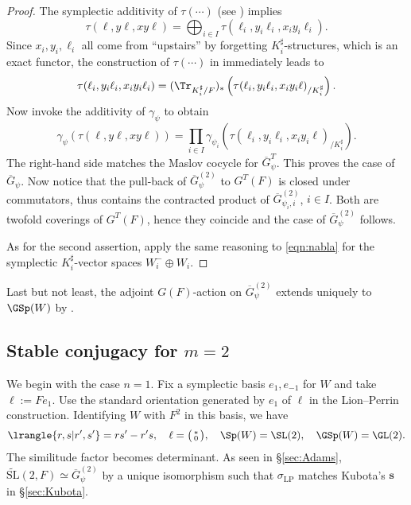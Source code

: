 \documentclass[a4paper,10pt]{article}
\begin{document}
\begin{proof}
	The symplectic additivity of $\tau(\cdots)$ (see \cite[p.532]{Li11}) implies
	\[ \tau(\ell, y\ell, xy\ell) = \bigoplus_{i \in I} \tau(\ell_i, y_i\ell_i, x_i y_i\ell_i). \]
	Since $x_i, y_i, \ell_i$ all come from ``upstairs'' by forgetting $K_i^\sharp$-structures, which is an exact functor, the construction of $\tau(\cdots)$ in \cite[\S 2.2.3]{Th06} immediately leads to
	\[ \tau(\ell_i, y_i \ell_i, x_i y_i \ell_i) = (\Tr_{K_i^\sharp/F})_* \left( \tau(\ell_i, y_i \ell_i, x_i y_i \ell)_{/K_i^\sharp} \right). \]
	Now invoke the additivity of $\gamma_\psi$ to obtain
	\[ \gamma_\psi\left( \tau(\ell, y\ell, xy\ell) \right) = \prod_{i \in I} \gamma_{\psi_i}\left( \tau(\ell_i, y_i \ell_i, x_i y_i \ell)_{/K_i^\sharp} \right). \]
	The right-hand side matches the Maslov cocycle for $\overline{G}^T_\psi$. This proves the case of $\overline{G}_\psi$. Now notice that the pull-back of $\overline{G}_\psi^{(2)}$ to $G^T(F)$ is closed under commutators, thus contains the contracted product of $\overline{G}^{(2)}_{\psi_i, i}$, $i \in I$. Both are twofold coverings of $G^T(F)$, hence they coincide and the case of $\overline{G}_\psi^{(2)}$ follows.
	
	As for the second assertion, apply the same reasoning to \eqref{eqn:nabla} for the symplectic $K_i^\sharp$-vector spaces $W_i^- \oplus W_i$.
\end{proof}

Last but not least, the adjoint $G(F)$-action on $\overline{G}_\psi^{(2)}$ extends uniquely to $\GSp(W)$ by \cite[Chapitre 4, I.8]{MVW87}.

\subsection{Stable conjugacy for \texorpdfstring{$m=2$}{m=2}}
We begin with the case $n=1$. Fix a symplectic basis $e_1, e_{-1}$ for $W$ and take $\ell := Fe_1$. Use the standard orientation generated by $e_1$ of $\ell$ in the Lion--Perrin construction. Identifying $W$ with $F^2$ in this basis, we have
\[ \lrangle{r,s | r',s'} = rs' - r's, \quad \ell = \bigl(\begin{smallmatrix} * \\ 0 \end{smallmatrix}\bigr), \quad \Sp(W) = \SL(2), \quad \GSp(W) = \GL(2). \]
The similitude factor becomes determinant. As seen in \S\ref{sec:Adams}, $\widetilde{\mathrm{SL}}(2, F) \simeq \overline{G}_\psi^{(2)}$ by a unique isomorphism such that $\sigma_\text{LP}$ matches Kubota's $\bm{s}$ in \S\ref{sec:Kubota}.
\end{document}
